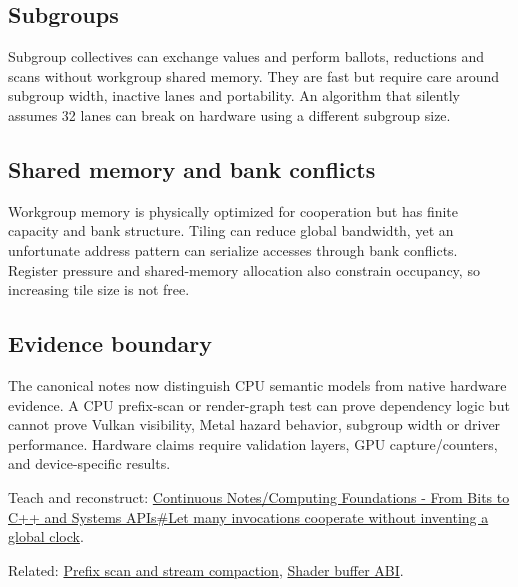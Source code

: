 \subsection{Subgroups}\label{subgroups}

Subgroup collectives can exchange values and perform ballots, reductions and scans without workgroup shared memory. They are fast but require care around subgroup width, inactive lanes and portability. An algorithm that silently assumes 32 lanes can break on hardware using a different subgroup size.

\subsection{Shared memory and bank conflicts}\label{shared-memory-and-bank-conflicts}

Workgroup memory is physically optimized for cooperation but has finite capacity and bank structure. Tiling can reduce global bandwidth, yet an unfortunate address pattern can serialize accesses through bank conflicts. Register pressure and shared-memory allocation also constrain occupancy, so increasing tile size is not free.

\subsection{Evidence boundary}\label{evidence-boundary}

The canonical notes now distinguish CPU semantic models from native hardware evidence. A CPU prefix-scan or render-graph test can prove dependency logic but cannot prove Vulkan visibility, Metal hazard behavior, subgroup width or driver performance. Hardware claims require validation layers, GPU capture/counters, and device-specific results.

Teach and reconstruct: \href{Continuous\%20Notes/Computing\%20Foundations\%20-\%20From\%20Bits\%20to\%20C++\%20and\%20Systems\%20APIs\#Let\%20many\%20invocations\%20cooperate\%20without\%20inventing\%20a\%20global\%20clock}{Continuous Notes/Computing Foundations - From Bits to C++ and Systems APIs\#Let many invocations cooperate without inventing a global clock}.

Related: \hyperref[appendix-f2ee4d086415]{Prefix scan and stream compaction}, \hyperref[appendix-749048795dbb]{Shader buffer ABI}.
